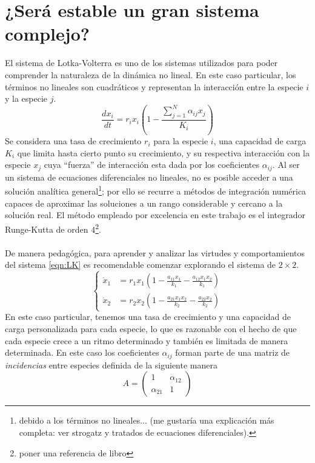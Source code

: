 \chapter{¿Será estable un gran sistema complejo?}

El sistema de Lotka-Volterra es uno de los sistemas utilizados para poder comprender la naturaleza de la dinámica no lineal. En este caso particular, los términos no lineales son cuadráticos y representan la interacción entre la especie $i$ y la especie $j$. 
\begin{equation}\label{eqn:LK}
	\frac{dx_i}{dt}=r_ix_i\left(1-\frac{\sum_{j=1}^N \alpha_{ij}x_j}{K_i}\right)
\end{equation}
Se considera una tasa de crecimiento $r_i$ para la especie $i$, una capacidad de carga $K_i$ que limita hasta cierto punto su crecimiento, y su respectiva interacción con la especie $x_j$ cuya ``fuerza'' de interacción esta dada por los coeficientes $\alpha_{ij}$. Al ser un sistema de ecuaciones diferenciales no lineales, no es posible acceder a una solución analítica general\footnote{debido a los términos no lineales... (me gustaría una explicación más completa: ver strogatz y tratados de ecuaciones diferenciales).}; por ello se recurre a métodos de integración numérica capaces de aproximar las soluciones a un rango considerable y cercano a la solución real. El método empleado por excelencia en este trabajo es el integrador Runge-Kutta de orden 4\footnote{poner una referencia de libro}.\\
\\
De manera pedagógica, para aprender y analizar las virtudes y comportamientos del sistema \ref{eqn:LK} es recomendable comenzar explorando el sistema de $2\times 2$.
$$
\begin{cases}
	\dot{x}_1&=r_1x_1(1-\frac{a_{11}x_1}{k_1}-\frac{a_{12}x_1x_2}{k_1})\\
	\dot{x}_2&=r_2x_2(1-\frac{a_{21}x_1x_2}{k_2}-\frac{a_{22}x_2}{k_2})
\end{cases}
$$
En este caso particular, tenemos una tasa de crecimiento y una capacidad de carga personalizada para cada especie, lo que es razonable con el hecho de que cada especie crece a un ritmo determinado y también es limitada de manera determinada. En este caso los coeficientes $\alpha_{ij}$ forman parte de una matriz de \textit{incidencias} entre especies definida de la siguiente manera
\begin{equation}\label{eqn:mIncidencias}
	A=
	\begin{pmatrix}
		1 & \alpha_{12}\\
		\alpha_{21} &1
	\end{pmatrix}
\end{equation}
